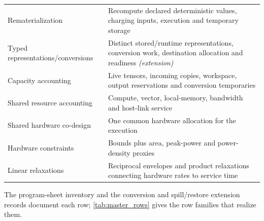 \begin{table}[t]
\begin{tabularx}{\linewidth}{@{}lX@{}}
Rematerialization & Recompute declared deterministic values, charging inputs, execution and temporary storage \\
Typed representations/conversions & Distinct stored/runtime representations, conversion work, destination allocation and readiness \emph{(extension)} \\
Capacity accounting & Live tensors, incoming copies, workspace, output reservations and conversion temporaries \\
Shared resource accounting & Compute, vector, local-memory, bandwidth and host-link service \\
Shared hardware co-design & One common hardware allocation for the execution \\
Hardware constraints & Bounds plus area, peak-power and power-density proxies \\
Linear relaxations & Reciprocal envelopes and product relaxations connecting hardware rates to service time \\
\bottomrule
\end{tabularx}
\end{table}

The program-sheet inventory and the conversion and spill/restore extension
records document each row; \cref{tab:master_rows} gives the row families that
realize them.
